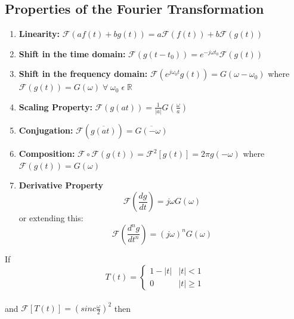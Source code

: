 \documentclass[11pt]{article}
\theoremstyle{definition}
\newcommand{\R}{\mathbb{R}}
\newcommand{\F}{{\mathcal{F}}}
\begin{document}
\subsection{Properties of the Fourier Transformation}
\begin{enumerate}
    \item \textbf{Linearity:} $\mathcal{F}(af(t) + bg(t)) = a\F (f(t)) + b\F (g(t))$
    \item \textbf{Shift in the time domain:} $\F (g(t-t_0)) = e^{-j\omega t_0}\F (g(t))$
    \item \textbf{Shift in the frequency domain:} $\F(e^{j\omega_0 t}g(t)) = G(\omega - \omega_0)$ where $\F (g(t))= G(\omega)\; \forall\; \omega_0\; \epsilon\; \R$
    \item \textbf{Scaling Property:} $\F (g(at)) = \frac{1}{|a|}G(\frac{\omega}{a})$
    \item \textbf{Conjugation:} $\F (\overline{g(at)}) = \overline{G(-\omega)}$
    \item \textbf{Composition:} $\F \circ \F(g(t)) = \F^2[g(t)] =  2\pi g(-\omega)$ where $\F (g(t))= G(\omega)$
    \item \textbf{Derivative Property} $$\F(\frac{dg}{dt}) = j\omega G(\omega)$$ or extending this:
    $$\F(\frac{d^ng}{dt^n}) = (j\omega)^n G(\omega)$$
\end{enumerate}
\newpage
If
\[T(t) =  \begin{cases} 
      1-|t| & |t| < 1 \\
      0 & |t| \geq 1
   \end{cases}
\]\\ and $\F[T(t)] = (sinc\frac{\omega}{2})^2$
then
\end{document}
